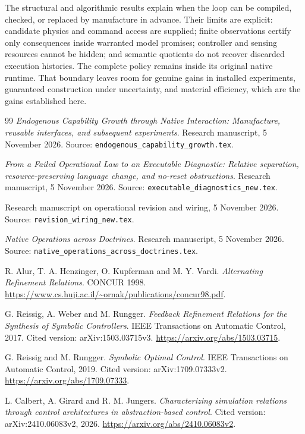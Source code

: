 \documentclass[11pt]{article}
\theoremstyle{definition}
\theoremstyle{remark}
\begin{document}
The structural and algorithmic results explain when the loop can be
compiled, checked, or replaced by manufacture in advance. Their limits
are explicit: candidate physics and command access are supplied;
finite observations certify only consequences inside warranted model
promises; controller and sensing resources cannot be hidden; and semantic
quotients do not recover discarded execution histories. The complete
policy remains inside its original native runtime. That boundary leaves
room for genuine gains in installed experiments, guaranteed construction
under uncertainty, and material efficiency, which are the gains established
here.


\begin{thebibliography}{99}
\emph{Endogenous Capability Growth through Native Interaction:
Manufacture, reusable interfaces, and subsequent experiments}.
Research manuscript, 5 November 2026.
Source: \texttt{endogenous\_capability\_growth.tex}.

\emph{From a Failed Operational Law to an Executable Diagnostic:
Relative separation, resource-preserving language change, and no-reset
obstructions}. Research manuscript, 5 November 2026.
Source: \texttt{executable\_diagnostics\_new.tex}.

Research manuscript on operational revision and wiring, 5 November 2026.
Source: \texttt{revision\_wiring\_new.tex}.

\emph{Native Operations across Doctrines}.
Research manuscript, 5 November 2026.
Source: \texttt{native\_operations\_across\_doctrines.tex}.

R. Alur, T. A. Henzinger, O. Kupferman and M. Y. Vardi.
\emph{Alternating Refinement Relations}. CONCUR 1998.
\url{https://www.cs.huji.ac.il/~ornak/publications/concur98.pdf}.

G. Reissig, A. Weber and M. Rungger.
\emph{Feedback Refinement Relations for the Synthesis of Symbolic
Controllers}. IEEE Transactions on Automatic Control, 2017.
Cited version: arXiv:1503.03715v3.
\url{https://arxiv.org/abs/1503.03715}.

G. Reissig and M. Rungger.
\emph{Symbolic Optimal Control}. IEEE Transactions on Automatic
Control, 2019. Cited version: arXiv:1709.07333v2.
\url{https://arxiv.org/abs/1709.07333}.

L. Calbert, A. Girard and R. M. Jungers.
\emph{Characterizing simulation relations through control architectures
in abstraction-based control}. Cited version: arXiv:2410.06083v2, 2026.
\url{https://arxiv.org/abs/2410.06083v2}.


\end{thebibliography}
\end{document}
